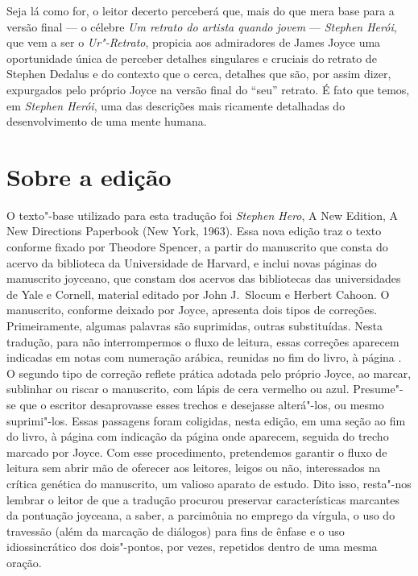 Seja lá como for, o leitor decerto perceberá que, mais do que mera base
para a versão final --- o célebre \textit{Um retrato do artista quando
jovem} --- \textit{Stephen Herói}, que vem a ser o \textit{Ur"-Retrato},
propicia aos admiradores de James Joyce uma oportunidade única de
perceber detalhes singulares e cruciais do retrato de Stephen Dedalus		
e do contexto que o cerca, detalhes que são, por assim dizer,
expurgados pelo próprio Joyce na versão final do “seu” retrato.  É fato
que temos, em \textit{Stephen Herói}, uma das descrições mais ricamente
detalhadas do desenvolvimento de uma mente humana.


\section*{Sobre a edição}

O texto"-base utilizado para esta tradução foi \textit{Stephen Hero}, A New
Edition, A New Directions Paperbook (New York, 1963).  Essa nova edição traz o
texto conforme fixado por Theodore Spencer, a partir do manuscrito que consta
do acervo da biblioteca da Universidade de Harvard, e inclui novas páginas do
manuscrito joyceano, que constam dos acervos das bibliotecas das universidades
de Yale e Cornell, material editado por John J.~Slocum e Herbert Cahoon.  O
manuscrito, conforme deixado por Joyce, apresenta dois tipos de correções.
Primeiramente, algumas palavras são suprimidas, outras substituídas.  Nesta tradução, 
para não interrompermos o fluxo de leitura, essas correções aparecem indicadas em notas 
com numeração arábica, reunidas no fim do livro, à página \pageref{notas"-arabicas}.  
O segundo tipo de correção reflete prática adotada pelo próprio Joyce, ao marcar, sublinhar ou riscar o
manuscrito, com lápis de cera vermelho ou azul.  Presume"-se que o escritor
desaprovasse esses trechos e desejasse alterá"-los, ou mesmo suprimi"-los.
Essas passagens foram coligidas, nesta edição, em uma seção ao fim do livro, à página \pageref{passagens} 
com indicação da página onde aparecem, seguida do trecho marcado por Joyce. Com esse 
procedimento, pretendemos garantir o fluxo de leitura sem abrir mão de oferecer aos 
leitores, leigos ou não, interessados na crítica genética do manuscrito, um valioso 
aparato de estudo. Dito isso, resta"-nos lembrar o leitor de que a tradução procurou preservar
características marcantes da pontuação joyceana, a saber, a parcimônia no
emprego da vírgula, o uso do travessão (além da marcação de diálogos) para fins
de ênfase e o uso idiossincrático dos dois"-pontos, por vezes, repetidos dentro
de uma mesma oração.


